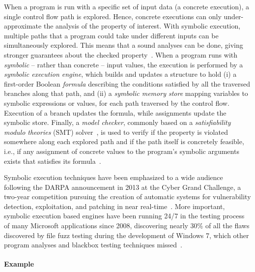When a program is run with a specific set of input data (a concrete execution), a single control flow path is explored. Hence, concrete executions can only under-approximate the analysis of the property of interest. With symbolic execution, multiple paths that a program could take under different inputs can be simultaneously explored. This means that a sound analyses can be done, giving stronger guarantees about the checked property~\cite{Baldoni:2018:SSE:3212709.3182657}. When a program runs with {\em symbolic} -- rather than concrete -- input values, the execution is performed by a {\em symbolic execution engine}, which builds and updates a structure to hold (i) a first-order Boolean {\em formula} describing the conditions satisfied by all the traversed branches along that path, and (ii) a {\em symbolic memory store} mapping variables to symbolic expressions or values, for each path traversed by the control flow. Execution of a branch updates the formula, while assignments update the symbolic store. Finally, a {\em model checker}, commonly based on a {\em satisfiability modulo theories} (SMT) solver~\cite{BKM14}, is  used to verify if the property is violated somewhere along each explored path and if the path itself is concretely feasible, i.e., if any assignment of concrete values to the program's symbolic arguments exists that satisfies its formula~\cite{Baldoni:2018:SSE:3212709.3182657}.

Symbolic execution techniques have been emphasized to a wide audience following the DARPA announcement in 2013 at the Cyber Grand Challenge, a two-year competition pursuing the creation of automatic systems for vulnerability detection, exploitation, and patching in near real-time~\cite{ANGR-SSP16}.
More important, symbolic execution based engines have been running 24/7 in the testing process of many Microsoft applications since 2008, discovering nearly 30\% of all the flaws discovered by file fuzz testing during the development of Windows 7, which other program analyses and blackbox testing techniques missed~\cite{SAGE-QUEUE12}.

\paragraph{Example}


